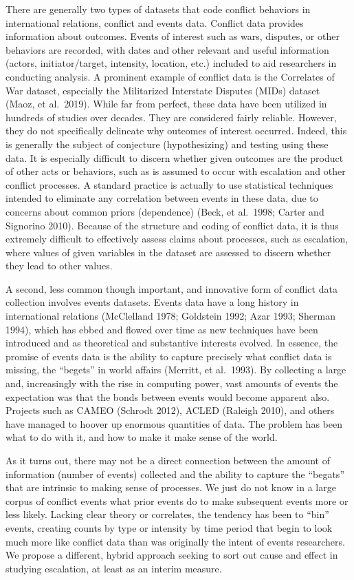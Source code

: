 \documentclass[
]{article}
\begin{document}
There are generally two types of datasets that code conflict behaviors
in international relations, conflict and events data. Conflict data
provides information about outcomes. Events of interest such as wars,
disputes, or other behaviors are recorded, with dates and other relevant
and useful information (actors, initiator/target, intensity, location,
etc.) included to aid researchers in conducting analysis. A prominent
example of conflict data is the Correlates of War dataset, especially
the Militarized Interstate Disputes (MIDs) dataset (Maoz, et al.~2019).
While far from perfect, these data have been utilized in hundreds of
studies over decades. They are considered fairly reliable. However, they
do not specifically delineate why outcomes of interest occurred. Indeed,
this is generally the subject of conjecture (hypothesizing) and testing
using these data. It is especially difficult to discern whether given
outcomes are the product of other acts or behaviors, such as is assumed
to occur with escalation and other conflict processes. A standard
practice is actually to use statistical techniques intended to eliminate
any correlation between events in these data, due to concerns about
common priors (dependence) (Beck, et al.~1998; Carter and Signorino
2010). Because of the structure and coding of conflict data, it is thus
extremely difficult to effectively assess claims about processes, such
as escalation, where values of given variables in the dataset are
assessed to discern whether they lead to other values.

A second, less common though important, and innovative form of conflict
data collection involves events datasets. Events data have a long
history in international relations (McClelland 1978; Goldstein 1992;
Azar 1993; Sherman 1994), which has ebbed and flowed over time as new
techniques have been introduced and as theoretical and substantive
interests evolved. In essence, the promise of events data is the ability
to capture precisely what conflict data is missing, the ``begets'' in
world affairs (Merritt, et al.~1993). By collecting a large and,
increasingly with the rise in computing power, vast amounts of events
the expectation was that the bonds between events would become apparent
also. Projects such as CAMEO (Schrodt 2012), ACLED (Raleigh 2010), and
others have managed to hoover up enormous quantities of data. The
problem has been what to do with it, and how to make it make sense of
the world.

As it turns out, there may not be a direct connection between the amount
of information (number of events) collected and the ability to capture
the ``begats'' that are intrinsic to making sense of processes. We just
do not know in a large corpus of conflict events what prior events do to
make subsequent events more or less likely. Lacking clear theory or
correlates, the tendency has been to ``bin'' events, creating counts by
type or intensity by time period that begin to look much more like
conflict data than was originally the intent of events researchers. We
propose a different, hybrid approach seeking to sort out cause and
effect in studying escalation, at least as an interim measure.
\end{document}
